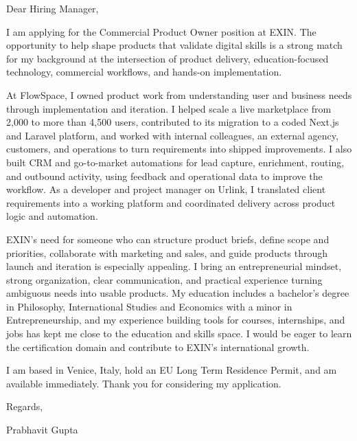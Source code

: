 \documentclass[a4paper,11pt]{article}
\begin{document}
Dear Hiring Manager,

I am applying for the Commercial Product Owner position at EXIN. The opportunity to help shape products that validate digital skills is a strong match for my background at the intersection of product delivery, education-focused technology, commercial workflows, and hands-on implementation.

At FlowSpace, I owned product work from understanding user and business needs through implementation and iteration. I helped scale a live marketplace from 2,000 to more than 4,500 users, contributed to its migration to a coded Next.js and Laravel platform, and worked with internal colleagues, an external agency, customers, and operations to turn requirements into shipped improvements. I also built CRM and go-to-market automations for lead capture, enrichment, routing, and outbound activity, using feedback and operational data to improve the workflow. As a developer and project manager on Urlink, I translated client requirements into a working platform and coordinated delivery across product logic and automation.

EXIN's need for someone who can structure product briefs, define scope and priorities, collaborate with marketing and sales, and guide products through launch and iteration is especially appealing. I bring an entrepreneurial mindset, strong organization, clear communication, and practical experience turning ambiguous needs into usable products. My education includes a bachelor's degree in Philosophy, International Studies and Economics with a minor in Entrepreneurship, and my experience building tools for courses, internships, and jobs has kept me close to the education and skills space. I would be eager to learn the certification domain and contribute to EXIN's international growth.

I am based in Venice, Italy, hold an EU Long Term Residence Permit, and am available immediately. Thank you for considering my application.

Regards,
\par
Prabhavit Gupta
\end{document}

